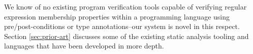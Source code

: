 We know of no existing program verification tools capable of verifying regular expression membership properties
within a programming language using pre/post-conditions or type annotations--our system is novel in this respect.
Section \ref{sec:prior-art} discusses some of the existing static analysis tooling and languages that have been
developed in more depth.